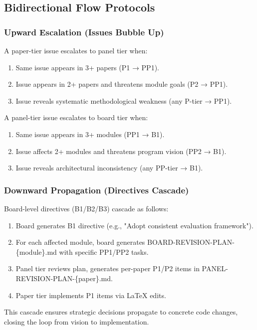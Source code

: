 \subsection{Bidirectional Flow Protocols}

\subsubsection{Upward Escalation (Issues Bubble Up)}

A paper-tier issue escalates to panel tier when:
\begin{enumerate}
\item Same issue appears in 3+ papers (P1 → PP1).
\item Issue appears in 2+ papers and threatens module goals (P2 → PP1).
\item Issue reveals systematic methodological weakness (any P-tier → PP1).
\end{enumerate}

A panel-tier issue escalates to board tier when:
\begin{enumerate}
\item Same issue appears in 3+ modules (PP1 → B1).
\item Issue affects 2+ modules and threatens program vision (PP2 → B1).
\item Issue reveals architectural inconsistency (any PP-tier → B1).
\end{enumerate}

\subsubsection{Downward Propagation (Directives Cascade)}

Board-level directives (B1/B2/B3) cascade as follows:
\begin{enumerate}
\item Board generates B1 directive (e.g., "Adopt consistent evaluation framework").
\item For each affected module, board generates BOARD-REVISION-PLAN-\{module\}.md with specific PP1/PP2 tasks.
\item Panel tier reviews plan, generates per-paper P1/P2 items in PANEL-REVISION-PLAN-\{paper\}.md.
\item Paper tier implements P1 items via LaTeX edits.
\end{enumerate}

This cascade ensures strategic decisions propagate to concrete code changes, closing the loop from vision to implementation.

